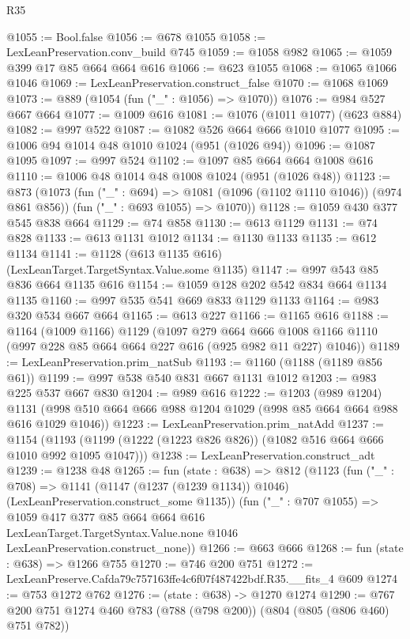 \begin{lexlean}{R35}
\begin{coremodule}
@1055 := Bool.false
@1056 := @678 @1055
@1058 := LexLeanPreservation.conv_build @745
@1059 := @1058 @982
@1065 := @1059 @399 @17 @85 @664 @664 @616
@1066 := @623 @1055
@1068 := @1065 @1066 @1046
@1069 := LexLeanPreservation.construct_false
@1070 := @1068 @1069
@1073 := @889 (@1054 (fun ("_" : @1056) => @1070))
@1076 := @984 @527 @667 @664
@1077 := @1009 @616
@1081 := @1076 (@1011 @1077) (@623 @884)
@1082 := @997 @522
@1087 := @1082 @526 @664 @666 @1010 @1077
@1095 := @1006 @94 @1014 @48 @1010 @1024 (@951 (@1026 @94))
@1096 := @1087 @1095
@1097 := @997 @524
@1102 := @1097 @85 @664 @664 @1008 @616
@1110 := @1006 @48 @1014 @48 @1008 @1024 (@951 (@1026 @48))
@1123 := @873
    (@1073
      (fun ("_" : @694) => @1081 (@1096 (@1102 @1110 @1046)) (@974 @861 @856))
      (fun ("_" : @693 @1055) => @1070))
@1128 := @1059 @430 @377 @545 @838 @664
@1129 := @74 @858
@1130 := @613 @1129
@1131 := @74 @828
@1133 := @613 @1131 @1012
@1134 := @1130 @1133
@1135 := @612 @1134
@1141 := @1128 (@613 @1135 @616) (LexLeanTarget.TargetSyntax.Value.some @1135)
@1147 := @997 @543 @85 @836 @664 @1135 @616
@1154 := @1059 @128 @202 @542 @834 @664 @1134 @1135
@1160 := @997 @535 @541 @669 @833 @1129 @1133
@1164 := @983 @320 @534 @667 @664
@1165 := @613 @227
@1166 := @1165 @616
@1188 := @1164
    (@1009 @1166)
    @1129
    (@1097
      @279
      @664
      @666
      @1008
      @1166
      @1110
      (@997 @228 @85 @664 @664 @227 @616 (@925 @982 @11 @227) @1046))
@1189 := LexLeanPreservation.prim_natSub
@1193 := @1160 (@1188 (@1189 @856 @61))
@1199 := @997 @538 @540 @831 @667 @1131 @1012
@1203 := @983 @225 @537 @667 @830
@1204 := @989 @616
@1222 := @1203
    (@989 @1204)
    @1131
    (@998 @510 @664 @666 @988 @1204 @1029 (@998 @85 @664 @664 @988 @616 @1029 @1046))
@1223 := LexLeanPreservation.prim_natAdd
@1237 := @1154
    (@1193 (@1199 (@1222 (@1223 @826 @826)) (@1082 @516 @664 @666 @1010 @992 @1095 @1047)))
@1238 := LexLeanPreservation.construct_adt
@1239 := @1238 @48
@1265 := fun (state : @638) =>
  @812
    (@1123
      (fun ("_" : @708) =>
      @1141 (@1147 (@1237 (@1239 @1134)) @1046) (LexLeanPreservation.construct_some @1135))
      (fun ("_" : @707 @1055) =>
      @1059
        @417
        @377
        @85
        @664
        @664
        @616
        LexLeanTarget.TargetSyntax.Value.none
        @1046
        LexLeanPreservation.construct_none))
@1266 := @663 @666
@1268 := fun (state : @638) => @1266 @755
@1270 := @746 @200 @751
@1272 := LexLeanPreserve.Cafda79c757163ffe4c6f07f487422bdf.R35.__fits_4 @609
@1274 := @753 @1272 @762
@1276 := (state : @638) -> @1270 @1274
@1290 := @767 @200 @751 @1274 @460 @783 (@788 (@798 @200)) (@804 (@805 (@806 @460) @751 @782))

\end{coremodule}
\end{lexlean}
